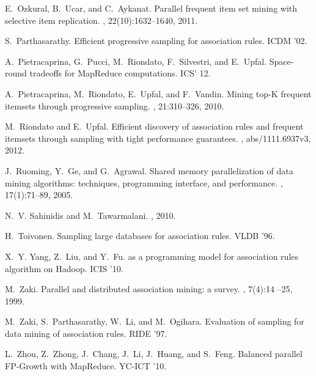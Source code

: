 \begin{thebibliography}{10}
\begin{small}
E.~Ozkural, B.~Ucar, and C.~Aykanat.
\newblock Parallel frequent item set mining with selective item replication.
,
  22(10):1632--1640, 2011.

S.~Parthasarathy.
\newblock Efficient progressive sampling for association rules.
\newblock ICDM '02.

A.~Pietracaprina, G.~Pucci, M.~Riondato, F.~Silvestri, and E.~Upfal.
\newblock Space-round tradeoffs for {MapReduce} computations.
\newblock ICS' 12. 

A.~Pietracaprina, M.~Riondato, E.~Upfal, and F.~Vandin.
\newblock Mining top-{K} frequent itemsets through progressive sampling.
, 21:310--326, 2010.

M.~Riondato and E.~Upfal.
\newblock Efficient discovery of association rules and frequent itemsets
  through sampling with tight performance guarantees.
, abs/1111.6937v3, 2012.

J.~Ruoming, Y.~Ge, and G.~Agrawal.
\newblock Shared memory parallelization of data mining algorithms: techniques,
  programming interface, and performance.
, 17(1):71--89, 2005.

N.~V. Sahinidis and M.~Tawarmalani.
, 2010.

H.~Toivonen.
\newblock Sampling large databases for association rules.
\newblock VLDB '96.

X.~Y. Yang, Z.~Liu, and Y.~Fu.
 as a programming model for association rules algorithm on
  {Hadoop}.
\newblock ICIS '10.

M.~Zaki.
\newblock Parallel and distributed association mining: a survey.
, 7(4):14 --25, 1999.

M.~Zaki, S.~Parthasarathy, W.~Li, and M.~Ogihara.
\newblock Evaluation of sampling for data mining of association rules.
\newblock RIDE '97.

L.~Zhou, Z.~Zhong, J.~Chang, J.~Li, J.~Huang, and S.~Feng.
\newblock Balanced parallel {FP-Growth} with {MapReduce}.
\newblock YC-ICT '10.

\end{small}
\end{thebibliography}
\fi

